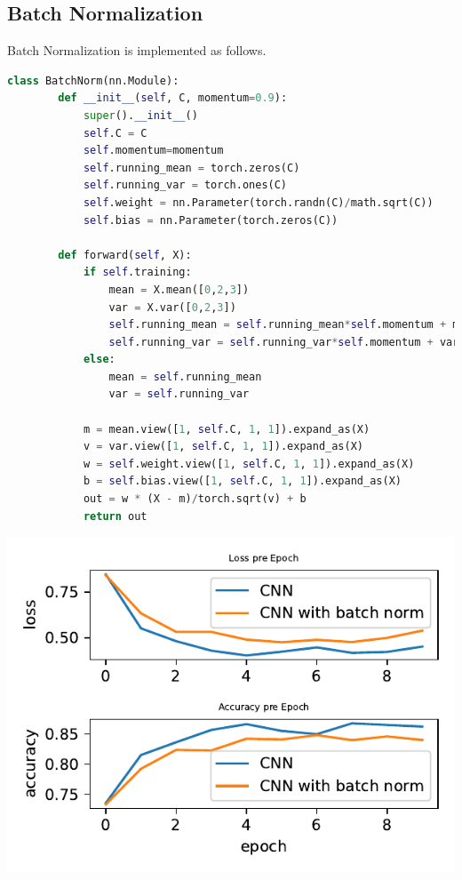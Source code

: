 \documentclass[11pt]{article}
\begin{document}
\subsection{Batch Normalization}

Batch Normalization is implemented as follows.
\begin{lstlisting}[language=python, caption=Batch Normalization class]
class BatchNorm(nn.Module):
        def __init__(self, C, momentum=0.9):
            super().__init__()
            self.C = C
            self.momentum=momentum
            self.running_mean = torch.zeros(C)
            self.running_var = torch.ones(C)
            self.weight = nn.Parameter(torch.randn(C)/math.sqrt(C))
            self.bias = nn.Parameter(torch.zeros(C))

        def forward(self, X):
            if self.training:
                mean = X.mean([0,2,3])
                var = X.var([0,2,3])
                self.running_mean = self.running_mean*self.momentum + mean*(1-self.momentum)
                self.running_var = self.running_var*self.momentum + var*(1-self.momentum)
            else:
                mean = self.running_mean
                var = self.running_var

            m = mean.view([1, self.C, 1, 1]).expand_as(X)
            v = var.view([1, self.C, 1, 1]).expand_as(X)
            w = self.weight.view([1, self.C, 1, 1]).expand_as(X)
            b = self.bias.view([1, self.C, 1, 1]).expand_as(X)
            out = w * (X - m)/torch.sqrt(v) + b
            return out
\end{lstlisting}

\includegraphics{figures/2c[2]_dnn_loss_epoch.pdf}


\end{document}

